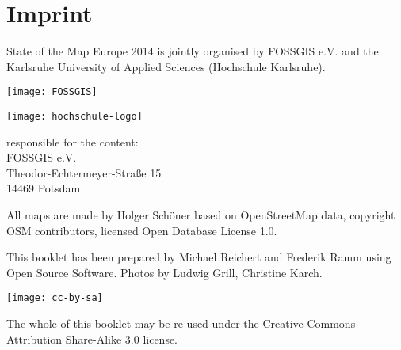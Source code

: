 \newpage
\section*{Imprint}

\begin{raggedright}
State of the Map Europe 2014 is jointly organised by FOSSGIS
e.V. and the Karlsruhe University of Applied Sciences
(Hochschule Karlsruhe).

\vspace{0.5em}
 \begin{minipage}[htbp]{0.47\textwidth}
	\texttt{[image: FOSSGIS]}
\end{minipage}
\hfill
\begin{minipage}[hbtp]{0.47\textwidth}
\texttt{[image: hochschule-logo]}
\end{minipage}

\vspace{1.6em}
\noindent responsible for the content:\\
FOSSGIS e.V.\\
Theodor-Echtermeyer-Straße 15\\
14469 Potsdam

\vspace{1em}
\noindent All maps are made by Holger Schöner based on Open\-Street\-Map
data, copyright OSM contributors, licensed Open Database License 1.0.

\vspace{0.5em}
\noindent This booklet has been prepared by Michael Reichert and Frederik
Ramm using Open Source Software. Photos by Ludwig Grill,
Christine Karch.

\vspace{1em}
\noindent \begin{minipage}[htbp]{0.2\textwidth}
\noindent\texttt{[image: cc-by-sa]}
\end{minipage}
\hfill
\begin{minipage}[hbtp]{0.74\textwidth}
The whole of this booklet may be re-used under the Creative
Commons Attribution Share-Alike 3.0 license.
\end{minipage}
\end{raggedright}

